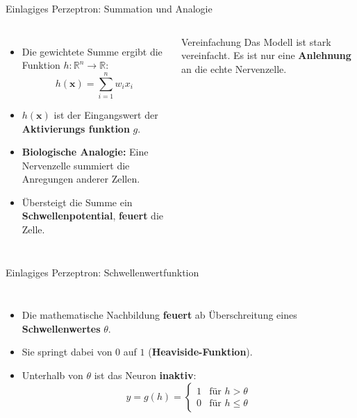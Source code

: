 \begin{frame}{Einlagiges Perzeptron: Summation und Analogie}
\begin{columns}
\begin{itemize}
  \item Die gewichtete Summe ergibt die Funktion
        $h: \mathbb{R}^n \to \mathbb{R}$:
        \[
          h(\mathbf{x}) = \sum_{i=1}^{n} w_i x_i
        \]
  \item $h(\mathbf{x})$ ist der Eingangswert der \textbf{Aktivierungs\-%
        funktion} $g$.
  \item \textbf{Biologische Analogie:} Eine Nervenzelle summiert die
        Anregungen anderer Zellen.
  \item Übersteigt die Summe ein \textbf{Schwellenpotential}, \textbf{feuert}
        die Zelle.
\end{itemize}

\begin{blockC1}{Vereinfachung}
Das Modell ist stark vereinfacht. Es ist nur eine \textbf{Anlehnung} an
die echte Nervenzelle.
\end{blockC1}
\end{columns}
\end{frame}

\begin{frame}{Einlagiges Perzeptron: Schwellenwertfunktion}
\begin{columns}
\begin{itemize}
  \item Die mathematische Nachbildung \textbf{feuert} ab Überschreitung
        eines \textbf{Schwellenwertes} $\theta$.
  \item Sie springt dabei von $0$ auf $1$ (\textbf{Heaviside-Funktion}).
  \item Unterhalb von $\theta$ ist das Neuron \textbf{inaktiv}:
        \[
          y = g(h) =
          \begin{cases}
            1 & \text{für } h > \theta\\
            0 & \text{für } h \leq \theta
          \end{cases}
        \]
\end{itemize}

\centering
{}
\end{columns}
\end{frame}

